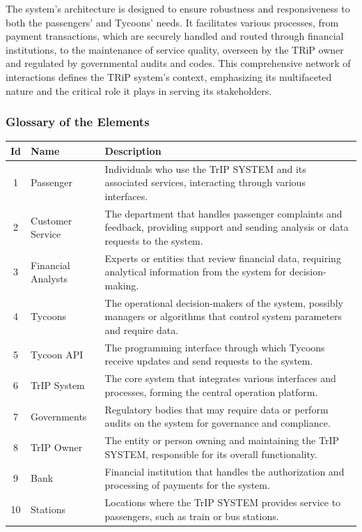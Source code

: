The system's architecture is designed to ensure robustness and responsiveness to both the passengers' and Tycoons' needs. It facilitates various processes, from payment transactions, which are securely handled and routed through financial institutions, to the maintenance of service quality, overseen by the TRiP owner and regulated by governmental audits and codes. This comprehensive network of interactions defines the TRiP system's context, emphasizing its multifaceted nature and the critical role it plays in serving its stakeholders.

\subsubsection{Glossary of the Elements}
\begin{table}[H]
\centering
\begin{tabular}{@{}clp{9cm}@{}}
\toprule
\textbf{Id} & \textbf{Name} & \textbf{Description} \\
\midrule
1 & Passenger & Individuals who use the TrIP SYSTEM and its associated services, interacting through various interfaces. \\
2 & Customer Service & The department that handles passenger complaints and feedback, providing support and sending analysis or data requests to the system. \\
3 & Financial Analysts & Experts or entities that review financial data, requiring analytical information from the system for decision-making. \\
4 & Tycoons & The operational decision-makers of the system, possibly managers or algorithms that control system parameters and require data. \\
5 & Tycoon API & The programming interface through which Tycoons receive updates and send requests to the system. \\
6 & TrIP System & The core system that integrates various interfaces and processes, forming the central operation platform. \\
7 & Governments & Regulatory bodies that may require data or perform audits on the system for governance and compliance. \\
8 & TrIP Owner & The entity or person owning and maintaining the TrIP SYSTEM, responsible for its overall functionality. \\
9 & Bank & Financial institution that handles the authorization and processing of payments for the system. \\
10 & Stations & Locations where the TrIP SYSTEM provides service to passengers, such as train or bus stations. \\

\end{tabular}
\end{table}
